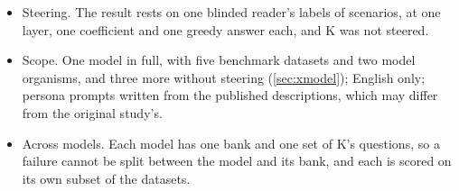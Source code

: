 \begin{itemize}[leftmargin=1.6em, itemsep=2pt]
  Layers 36 and 44 are post hoc.
\item Steering. The result rests on one blinded reader's labels of  scenarios, at one
  layer, one coefficient and one greedy answer each, and K was not steered.
\item Scope. One model in full, with five benchmark datasets and two model organisms, and three more
  without steering (\cref{sec:xmodel}); English only; persona prompts written from the published
  descriptions, which may differ from the original study's.
\item Across models. Each model has one bank and one set of K's questions, so a failure cannot be split
  between the model and its bank, and each is scored on its own subset of the datasets.
\end{itemize}

